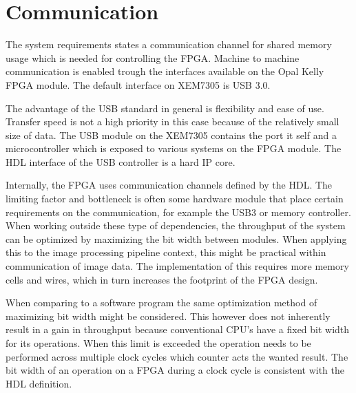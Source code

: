 \documentclass[12pt]{report}
\begin{document}
\section{Communication}
The system requirements states a communication channel for shared memory usage which is needed for controlling the FPGA. Machine to machine communication is enabled trough the interfaces available on the Opal Kelly FPGA module. The default interface on XEM7305 is USB 3.0.
\par
The advantage of the USB standard in general is flexibility and ease of use. Transfer speed is not a high priority in this case because of the relatively small size of data. The USB module on the XEM7305 contains the port it self and a microcontroller which is exposed to various systems on the FPGA module. The HDL interface of the USB controller is a hard IP core.
\par
Internally, the FPGA uses communication channels defined by the HDL. The limiting factor and bottleneck is often some hardware module that place certain requirements on the communication, for example the USB3 or memory controller. When working outside these type of dependencies, the throughput of the system can be optimized by maximizing the bit width between modules. When applying this to the image processing pipeline context, this might be practical within communication of image data. The implementation of this requires more memory cells and wires, which in turn increases the footprint of the FPGA design.
\par
When comparing to a software program the same optimization method of maximizing bit width might be considered. This however does not inherently result in a gain in throughput because conventional CPU's have a fixed bit width for its operations. When this limit is exceeded the operation needs to be performed across multiple clock cycles which counter acts the wanted result. The bit width of an operation on a FPGA during a clock cycle is consistent with the HDL definition. 

\end{document}
